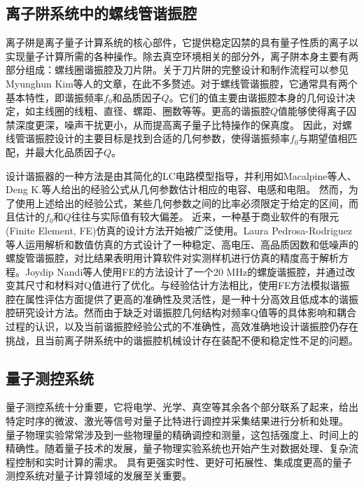\subsection[离子阱系统中的螺线管谐振腔]{离子阱系统中的螺线管谐振腔}

离子阱是离子量子计算系统的核心部件，它提供稳定囚禁的具有量子性质的离子以实现量子计算所需的各种操作。除去真空环境相关的部分外，离子阱本身主要有两部分组成：螺线圈谐振腔及刀片阱。关于刀片阱的完整设计和制作流程可以参见Myunghun Kim等人\cite[]{Kim_Kim_Hong_Lee_Moon_Lee_Kim_Ha_Sim_Lee_2022}的文章，在此不多赘述。对于螺线管谐振腔，它通常具有两个基本特性，即谐振频率$f_0$和品质因子$Q$。它们的值主要由谐振腔本身的几何设计决定，如主线圈的线粗、直径、螺距、圈数等等。更高的谐振腔$Q$值能够使得离子囚禁深度更深，噪声干扰更小，从而提高离子量子比特操作的保真度。
因此，对螺线管谐振腔设计的主要目标是找到合适的几何参数，使得谐振频率$f_0$与期望值相匹配，并最大化品质因子$Q$。

设计谐振器的一种方法是由其简化的LC电路模型指导，并利用如Macalpine等人\cite[]{Macalpine_Schildknecht_1959}、Deng K.等人\cite[]{Deng_Sun_Yuan_Xu_Zhang_Lu_Luo_2014}给出的经验公式从几何参数估计相应的电容、电感和电阻。
然而，为了使用上述给出的经验公式，某些几何参数之间的比率必须限定于给定的区间，而且估计的$f_0$和$Q$往往与实际值有较大偏差。
近来，一种基于商业软件的有限元(Finite Element, FE)仿真的设计方法开始被广泛使用。Laura Pedrosa-Rodriguez等人\cite[]{Pedrosa_Rodriguez_Outerelo_Gomez_Alcala_de_Vicente_Diaz_Otero_2018}运用解析和数值仿真的方式设计了一种稳定、高电压、高品质因数和低噪声的螺旋管谐振腔，对比结果表明用计算软件对实测样机进行仿真的精度高于解析方程。Joydip Nandi等人\cite[]{Nandi_Sikdar_Reza_Misra_Das_Ray_2020}使用FE的方法设计了一个20 MHz的螺旋谐振腔，并通过改变其尺寸和材料对Q值进行了优化。与经验估计方法相比，使用FE方法模拟谐振腔在属性评估方面提供了更高的准确性及灵活性，是一种十分高效且低成本的谐振腔研究设计方法。然而由于缺乏对谐振腔几何结构对频率Q值等的具体影响和耦合过程的认识，以及当前谐振腔经验公式的不准确性，高效准确地设计谐振腔仍存在挑战，且当前离子阱系统中的谐振腔机械设计存在装配不便和稳定性不足的问题。

\subsection[量子测控系统]{量子测控系统}
量子测控系统十分重要，它将电学、光学、真空等其余各个部分联系了起来，给出特定时序的微波、激光等信号对量子比特进行调控并采集结果进行分析和处理。
量子物理实验常常涉及到一些物理量的精确调控和测量，这包括强度上、时间上的精确性。随着量子技术的发展，量子物理实验系统也开始产生对数据处理、复杂流程控制和实时计算的需求。
具有更强实时性、更好可拓展性、集成度更高的量子测控系统对量子计算领域的发展至关重要。

